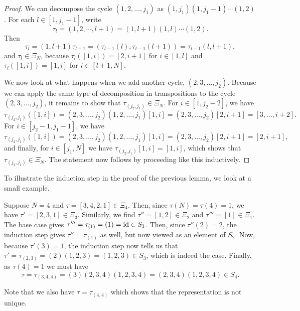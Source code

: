 \begin{proof}
	We can decompose the cycle $(1,2,\dots, j_1)$ as $(1, j_1)(1, j_1 - 1)\cdots (1, 2)$.
	For each $l \in [1, j_1 - 1]$, write
	\begin{equation*}
		\tau_l = (1,2,\cdots, l+1) = (1, l+1) (1, l) \cdots (1, 2).
	\end{equation*}
	Then
	\begin{equation*}
		\tau_l = (1, l+1)\tau_{l-1} = (\tau_{l-1}(l), \tau_{l-1}(l+1)) = \tau_{l-1}(l, l+1),
	\end{equation*}
	and $\tau_l \in \Xi_N$, because $\tau_l ([1, i]) = [2, i+1]$ for $i \in [1, l]$ and
	$\tau_l ([1, i]) = [1, i]$ for $i \in [l+1, N]$.

	We now look at what happens when we add another cycle, $(2,3,\dots, j_2)$. Because we
	can apply the same type of decomposition in transpositions to the cycle $(2,3,\dots,
		j_2)$, it remains to show that $\tau_{(j_2, j_1)} \in \Xi_N$. For $i \in [1, j_2 - 2]$,
	we have
	\begin{equation*}
		\tau_{(j_2, j_1)}([1, i]) = (2,3, \dots, j_2)(1,2,\dots,j_1)[1, i]= (2,3,\dots,j_2)[2, i+1] = [3,\dots,i+2].
	\end{equation*}
	For $i \in [j_2 - 1, j_1 -1]$, we have
	\begin{equation*}
		\tau_{(j_2,j_1)}([1, i]) = (2,3,\dots, j_2)(1,2, \dots, j_1)[1, i] = (2,3,\dots,j_2)[2,i+1] = [2, i+1],
	\end{equation*}
	and finally, for $i \in [j_1, N]$ we have $\tau_{(j_2,j_1)}[1,i] = [1, i]$, which shows that $\tau_{(j_2, j_1)} \in \Xi_N$. The statement now follows by proceeding like this inductively.
\end{proof}

To illustrate the induction step in the proof of the previous lemma, we look at a small
example.
\begin{example}

	Suppose $N = 4$ and $\tau = [3,4,2,1] \in \Xi_4$. Then, since $\tau(N) = \tau(4) = 1$,
	we have $\tau' = [2,3,1] \in \Xi_{3}$. Similarly, we find $\tau'' = [1,2] \in \Xi_2$
	and $\tau''' = [1] \in \Xi_1$. The base case gives $\tau''' = \tau_{(1)} = (1) = \operatorname{id}
		\in S_1$. Then, since $\tau''(2) = 2$, the induction step gives $\tau'' = \tau_{(1)}$
	as well, but now viewed as an element of $S_2$. Now, because $\tau'(3) = 1$, the
	induction step now tells us that $\tau' = \tau_{(2,3)} = (2)(1,2,3) = (1,2,3) \in S_3$,
	which is indeed the case. Finally, as $\tau(4) = 1$ we must have
	\begin{equation*}
		\tau = \tau_{(3,4,4)} = (3)(2,3,4)(1,2,3,4) = (2,3,4)(1,2,3,4) \in S_4.
	\end{equation*}

	Note that we also have $\tau = \tau_{(4,4)}$ which shows that the representation is not
	unique.
\end{example}

